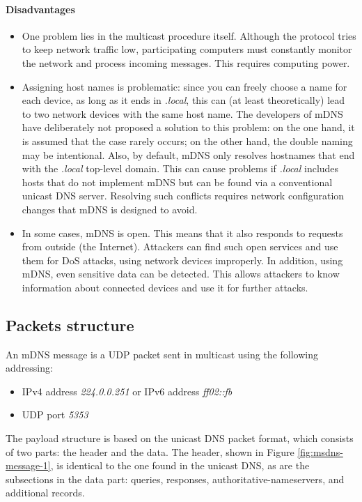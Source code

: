 \documentclass[fleqn, 11pt]{SelfArx} %
\begin{document}
\paragraph{Disadvantages} 
\begin{itemize}[leftmargin=*]
    \item One problem lies in the multicast procedure itself. Although the protocol tries to keep network traffic low, participating computers must constantly monitor the network and process incoming messages. This requires computing power.
    \item Assigning host names is problematic: since you can freely choose a name for each device, as long as it ends in {\it{.local}}, this can (at least theoretically) lead to two network devices with the same host name. The developers of mDNS have deliberately not proposed a solution to this problem: on the one hand, it is assumed that the case rarely occurs; on the other hand, the double naming may be intentional. \newline 
    Also, by default, mDNS only resolves hostnames that end with the {\it{.local}} top-level domain. This can cause problems if {\it{.local}} includes hosts that do not implement mDNS but can be found via a conventional unicast DNS server. Resolving such conflicts requires network configuration changes that mDNS is designed to avoid.
    \item In some cases, mDNS is open. This means that it also responds to requests from outside (the Internet). Attackers can find such open services and use them for DoS attacks, using network devices improperly. \newline
    In addition, using mDNS, even sensitive data can be detected. This allows attackers to know information about connected devices and use it for further attacks.
\end{itemize}

\subsection{Packets structure}
An mDNS message is a UDP packet sent in multicast using the following addressing:
\begin{itemize}[leftmargin=*]
    \item IPv4 address \textit{224.0.0.251} or IPv6 address \textit{ff02::fb}
    \item UDP port \textit{5353}
\end{itemize}
The payload structure is based on the unicast DNS packet format, which consists of two parts: the header and the data.\newline
The header, shown in Figure \ref{fig:msdns-message-1}, is identical to the one found in the unicast DNS, as are the subsections in the data part: queries, responses, authoritative-nameservers, and additional records.
\end{document}
